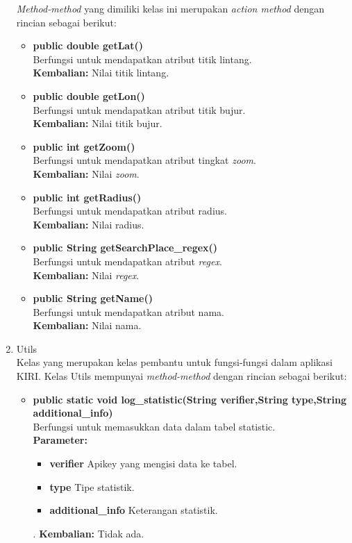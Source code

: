 \begin{enumerate}
	\textit{Method-method} yang dimiliki kelas ini merupakan \textit{action method} dengan rincian sebagai berikut:
	\begin{itemize}
		\item \textbf{public double getLat()}\\
		Berfungsi untuk mendapatkan atribut titik lintang.\\
		\textbf{Kembalian:}  Nilai titik lintang.
		
		\item \textbf{public double getLon()}\\
		Berfungsi untuk mendapatkan atribut titik bujur.\\
		\textbf{Kembalian:}  Nilai titik bujur.
		
		\item \textbf{public int getZoom()}\\
		Berfungsi untuk mendapatkan atribut tingkat \textit{zoom}.\\
		\textbf{Kembalian:}  Nilai \textit{zoom}.
		
		\item \textbf{public int getRadius()}\\
		Berfungsi untuk mendapatkan atribut radius.\\
		\textbf{Kembalian:}  Nilai radius.
		
		\item \textbf{public String getSearchPlace\_regex()}\\
		Berfungsi untuk mendapatkan atribut \textit{regex}.\\
		\textbf{Kembalian:}  Nilai \textit{regex}.
		
		\item \textbf{public String getName()}\\
		Berfungsi untuk mendapatkan atribut nama.\\
		\textbf{Kembalian:}  Nilai nama.
	\end{itemize}
	
	\item Utils\\
	Kelas yang merupakan kelas pembantu untuk fungsi-fungsi dalam aplikasi KIRI. Kelas Utils mempunyai \textit{method-method} dengan rincian sebagai berikut:
	\begin{itemize}
	
		\item \textbf{public static void log\_statistic(String verifier,String type,String additional\_info)}\\
		Berfungsi untuk memasukkan data dalam tabel statistic.\\
		\textbf{Parameter:}
				\begin{itemize}
					\item \textbf{verifier} Apikey yang mengisi data ke tabel.
					\item \textbf{type} Tipe statistik.
					\item \textbf{additional\_info} Keterangan statistik.
				\end{itemize}.
		\textbf{Kembalian:}  Tidak ada.
	

\end{itemize}
\end{enumerate}
